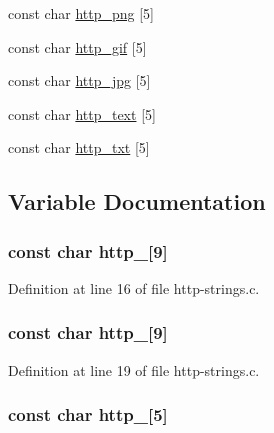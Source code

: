 \begin{DoxyCompactItemize}
const char \hyperlink{http-strings_8h_a2d5a64e8568607133bdf64f53ab719e6}{http\_\-png} \mbox{[}5\mbox{]}
\item 
const char \hyperlink{http-strings_8h_a21f4d6b0759786044bce910d140df3b7}{http\_\-gif} \mbox{[}5\mbox{]}
\item 
const char \hyperlink{http-strings_8h_acecfa49a95be67df62b2421efe1d5be3}{http\_\-jpg} \mbox{[}5\mbox{]}
\item 
const char \hyperlink{http-strings_8h_a03afa2e3239d727db67e1d943268bfbe}{http\_\-text} \mbox{[}5\mbox{]}
\item 
const char \hyperlink{http-strings_8h_a4f366bfe5aadc430314df6368294c385}{http\_\-txt} \mbox{[}5\mbox{]}
\end{DoxyCompactItemize}


\subsection{Variable Documentation}
\hypertarget{http-strings_8h_a53c130cd156bfd5adeb5f7e4cc5967e4}{
\subsubsection[{http\_\-10}]{\setlength{\rightskip}{0pt plus 5cm}const char {\bf http\_}\mbox{[}9\mbox{]}}}
\label{http-strings_8h_a53c130cd156bfd5adeb5f7e4cc5967e4}


Definition at line 16 of file http-\/strings.c.

\hypertarget{http-strings_8h_a9bc6680c526e8354582bb9f71c50710f}{
\subsubsection[{http\_\-11}]{\setlength{\rightskip}{0pt plus 5cm}const char {\bf http\_}\mbox{[}9\mbox{]}}}
\label{http-strings_8h_a9bc6680c526e8354582bb9f71c50710f}


Definition at line 19 of file http-\/strings.c.

\hypertarget{http-strings_8h_a051b06f37d5b16df80d17fb10e858c29}{
\subsubsection[{http\_\-200}]{\setlength{\rightskip}{0pt plus 5cm}const char {\bf http\_}\mbox{[}5\mbox{]}}}
\label{http-strings_8h_a051b06f37d5b16df80d17fb10e858c29}


